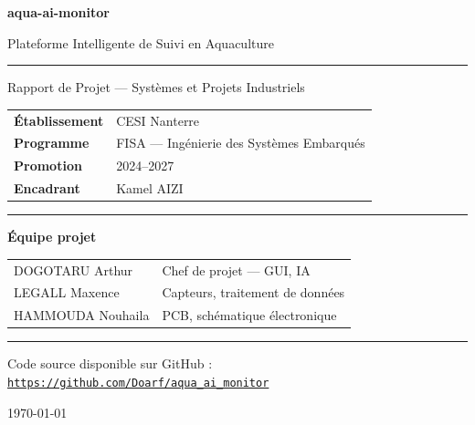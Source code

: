 \documentclass[12pt,a4paper]{report}
\begin{document}
\begin{titlepage}
  \centering
  \vspace*{1cm}


  \vspace{0.8cm}
  {\fontsize{28}{32}\selectfont\bfseries\color{primary} aqua-ai-monitor}

  \vspace{0.4cm}
  {\Large\color{secondary} Plateforme Intelligente de Suivi en Aquaculture}

  \vspace{0.8cm}
  \textcolor{secondary!60}{\rule{0.6\textwidth}{0.4pt}}

  \vspace{0.8cm}
  {\large Rapport de Projet --- Systèmes et Projets Industriels}

  \vspace{1cm}
  \begin{tabular}{ll}
    \textbf{Établissement} & CESI Nanterre \\[4pt]
    \textbf{Programme}     & FISA --- Ingénierie des Systèmes Embarqués \\[4pt]
    \textbf{Promotion}     & 2024--2027 \\[4pt]
    \textbf{Encadrant}     & Kamel AIZI \\[4pt]
  \end{tabular}

  \vspace{1cm}
  \textcolor{secondary!60}{\rule{0.6\textwidth}{0.4pt}}

  \vspace{0.8cm}
  \textbf{Équipe projet}

  \vspace{0.4cm}
  \begin{tabular}{ll}
    DOGOTARU Arthur   & Chef de projet --- GUI, IA \\[4pt]
    LEGALL Maxence    & Capteurs, traitement de données \\[4pt]
    HAMMOUDA Nouhaila & PCB, schématique électronique \\[4pt]
  \end{tabular}

  \vspace{0.6cm}
  \textcolor{secondary!60}{\rule{0.6\textwidth}{0.4pt}}

  \vspace{0.4cm}
  {\small\color{secondary} Code source disponible sur GitHub :}\\[4pt]
  \href{https://github.com/Doarf/aqua_ai_monitor}{%
    \texttt{\color{primary}https://github.com/Doarf/aqua\_ai\_monitor}}

  \vfill
  {\color{secondary}\today}
\end{titlepage}
\end{document}
